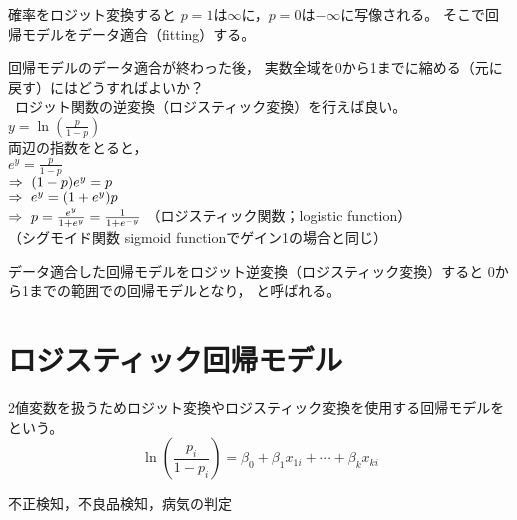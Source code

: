 \MyFrame{}
{
  確率をロジット変換すると
  $p=1$は$\infty$に，$p=0$は$-\infty$に写像される。
  そこで回帰モデルをデータ適合（fitting）する。
}

\MyFrame{}
{
  回帰モデルのデータ適合が終わった後，
  実数全域を0から1までに縮める（元に戻す）にはどうすればよいか？\\
  \ra~ロジット関数の逆変換（ロジスティック変換）を行えば良い。\\
  $y=\ln \left(\frac{p}{1-p}\right)$\\
  両辺の指数をとると，\\
  $e^y=\frac{p}{1-p}$\\
  $\Rightarrow~(1-p)e^y=p$\\
  $\Rightarrow~e^y=(1+e^y)p$\\
  $\Rightarrow~p=\frac{e^y}{1+e^y}=\frac{1}{1+e^{-y}}$
  （ロジスティック関数；logistic function）\\
  （シグモイド関数 sigmoid functionでゲイン1の場合と同じ）

}

\MyFrame{}
{
  データ適合した回帰モデルをロジット逆変換（ロジスティック変換）すると
  0から1までの範囲での回帰モデルとなり，
  と呼ばれる。
}

\section{ロジスティック回帰モデル}

\MyFrame{\insertsection}
{
  {
    2値変数を扱うためロジット変換やロジスティック変換を使用する回帰モデルを
    という。
    \[\ln\left(\frac{p_i}{1-p_i}\right)
      =\beta_0 + \beta_1 x_{1i}+\cdots+\beta_k x_{ki}\]
  }
}

\MyFrame{\insertsection}
{
  {
    不正検知，不良品検知，病気の判定 
  }
}

{
  \tiny
  
}

{
}


